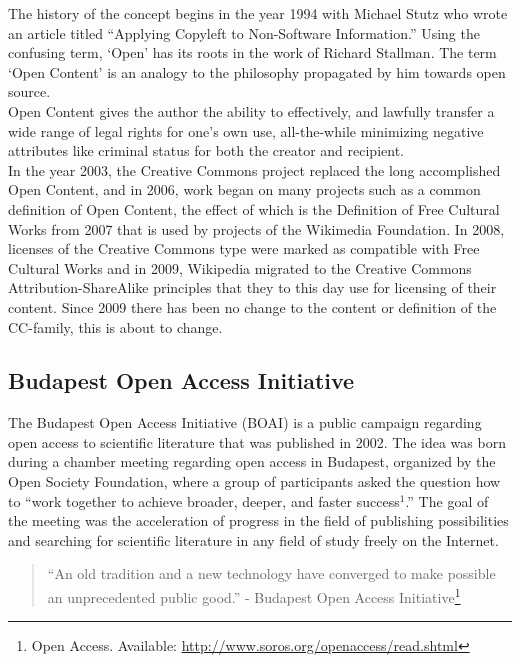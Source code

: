 \documentclass[a4paper]{article}
\begin{document}
\noindent
The history of the concept begins in the year 1994 with Michael Stutz who wrote an article titled ``Applying Copyleft to Non-Software Information.'' Using the confusing term, `Open' has its roots in the work of Richard Stallman. The term `Open Content' is an analogy to the philosophy propagated by him towards open source. \\ 

\noindent
Open Content gives the author the ability to effectively, and lawfully transfer a wide range of legal rights for one's own use, all-the-while minimizing negative attributes like criminal status for both the creator and recipient. \\ 

\noindent
In the year 2003, the Creative Commons project replaced the long accomplished Open Content, and in 2006, work began on many projects such as a common definition of Open Content, the effect of which is the Definition of Free Cultural Works from 2007 that is used by projects of the Wikimedia Foundation. In 2008, licenses of the Creative Commons type were marked as compatible with Free Cultural Works and in 2009, Wikipedia migrated to the Creative Commons Attribution-ShareAlike principles that they to this day use for licensing of their content. Since 2009 there has been no change to the content or definition of the CC-family, this is about to change. 

\subsection{Budapest Open Access Initiative}

The Budapest Open Access Initiative (BOAI) is a public campaign regarding open access to scientific literature that was published in 2002. The idea was born during a chamber meeting regarding open access in Budapest, organized by the Open Society Foundation, where a group of participants asked the question how to ``work together to achieve broader, deeper, and faster success$^1$.'' The goal of the meeting was the acceleration of progress in the field of publishing possibilities and searching for scientific literature in any field of study freely on the Internet. \\

\begin{quote}
``An old tradition and a new technology have converged to make possible an unprecedented public good.'' - Budapest Open Access Initiative\footnote{Open Access. Available: \url{http://www.soros.org/openaccess/read.shtml}} \\
\end{quote} 
\end{document}
